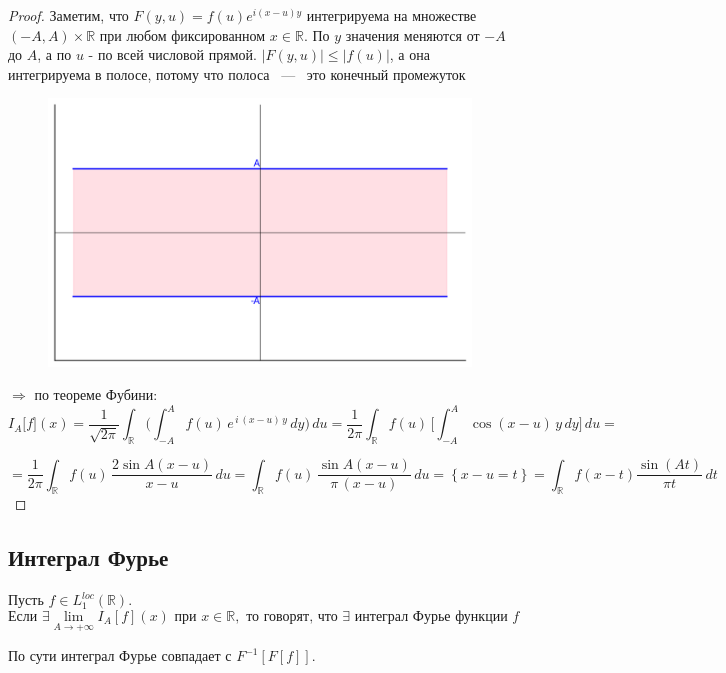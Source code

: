 \begin{proof}

Заметим, что $F(y, u) = f(u)e^{i(x-u)y}$ интегрируема на множестве $(-A, A) \times \mathbb{R}$ при любом фиксированном $x \in \mathbb{R}$. По $y$ значения меняются от $-A$ до $A$, а по $u$ - по всей числовой прямой. $|F(y, u)| \leq |f(u)|$, а она интегрируема в полосе, потому что полоса ~---~ это конечный промежуток

\begin{figure}[h]
    \centering
    \includegraphics[width=0.8\linewidth]{Pictures/graph1.png}
    \label{fig:graph1}
\end{figure}

$\Rightarrow$ по теореме Фубини:
\[
I_{A}\bigl[f\bigr](x)
= \frac{1}{\sqrt{2\pi}}
\int_{\mathbb{R}}
\Biggl(
\int_{-A}^{A} f(u)\,e^{\,i\,(x - u)\,y}\,dy
\Biggr)\,du
= \frac{1}{2\pi}
\int_{\mathbb{R}}
f(u)\,
\Biggl[
\int_{-A}^{A}
\cos(x - u)\,y\,dy
\Biggr]
\,du = 
\]

\[
= \frac{1}{2\pi}
\int_{\mathbb{R}}
f(u)\,
\frac{2 \sin A(x - u)}{x - u}
\,du
=
\int_{\mathbb{R}}
f(u)\,
\frac{\sin A(x - u)}{\pi\,(x - u)}
\,du = \left\{
    x - u = t
\right\} = 
\int_{\mathbb{R}} 
f(x - t) 
\frac{\sin(At)}{\pi t} \, dt
\]

\end{proof}

\subsection{Интеграл Фурье}

\begin{definition}
    Пусть $f \in L_1^{loc}(\mathbb{R})$.
\[
\text{Если } \exists \lim_{A \to +\infty} I_A[f](x) \text{ при } x \in \mathbb{R}, \text{ то говорят, что $\exists$ интеграл Фурье функции } f 
\]

\begin{center}
    По сути интеграл Фурье совпадает с $F^{-1}[F[f]].$
\end{center}
\end{definition}

